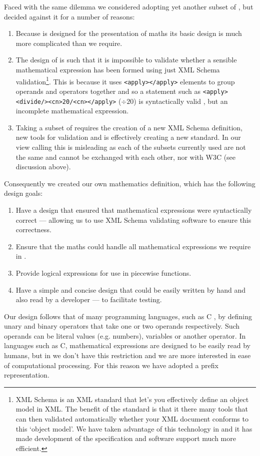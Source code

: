 Faced with the same dilemma we considered adopting yet another subset
of \mathml, but decided against it for a number of reasons:
\begin{enumerate}
\item Because \mathml is designed for the presentation of maths its
  basic design is much more complicated than we require.
\item The design of \mathml is such that it is impossible to validate
  whether a sensible mathematical expression has been formed using
  just XML Schema validation\footnote{XML Schema is an XML standard
    that let's you effectively define an object model in XML. The
    benefit of the standard is that it there many tools that can then
    validated automatically whether your XML document conforms to this
    `object model'. We have taken advantage of this technology in
    \pharmml and it has made development of the specification and
    software support much more efficient.}. This is because it uses
  \verb|<apply></apply>| elements to group operands and operators
  together and so a statement such as
  \verb|<apply><divide/><cn>20/<cn></apply>| ($\div 20$) is
  syntactically valid \mathml, but an incomplete mathematical
  expression.
\item Taking a subset of \mathml requires the creation of a new XML
  Schema definition, new tools for validation and is effectively
  creating a new standard. In our view calling this \mathml is
  misleading as each of the \mathml subsets currently used are not the
  same and cannot be exchanged with each other, nor with W3C \mathml
  (see discussion above).
\end{enumerate}
Consequently we created our own mathematics definition, which has the
following design goals:
\begin{enumerate}
\item Have a design that ensured that mathematical expressions
  were syntactically correct --- allowing us to use XML Schema
  validating software to ensure this correctness.
\item Ensure that the maths could handle all mathematical expressions
  we require in \pharmml.
\item Provide logical expressions for use in piecewise functions.
\item Have a simple and concise design that could be easily written by hand
  and also read by a developer --- to facilitate testing.
\end{enumerate}

Our design follows that of many programming languages, such as C
\cite{Kernighan:1988:CPL:576122}, by defining unary and binary
operators that take one or two operands respectively. Such operands
can be literal values (e.g.\xspace numbers), variables or another
operator. In languages such as C, mathematical expressions are
designed to be easily read by humans, but in \pharmml we don't have
this restriction and we are more interested in ease of computational
processing. For this reason we have adopted a prefix representation.

